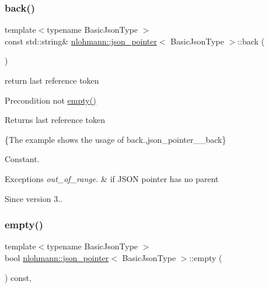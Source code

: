 \subsubsection{\texorpdfstring{back()}{back()}}
{\footnotesize\ttfamily template$<$typename Basic\+Json\+Type $>$ \\
const std\+::string\& \hyperlink{classnlohmann_1_1json__pointer}{nlohmann\+::json\+\_\+pointer}$<$ Basic\+Json\+Type $>$\+::back (\begin{DoxyParamCaption}{ }\end{DoxyParamCaption})\hspace{0.3cm}{\ttfamily [inline]}}



return last reference token 

\begin{DoxyPrecond}{Precondition}
not {\ttfamily \hyperlink{classnlohmann_1_1json__pointer_a649252bda4a2e75a0915b11a25d8bcc3}{empty()}} 
\end{DoxyPrecond}
\begin{DoxyReturn}{Returns}
last reference token
\end{DoxyReturn}
\{The example shows the usage of {\ttfamily back}.,json\+\_\+pointer\+\_\+\+\_\+back\}

Constant.


\begin{DoxyExceptions}{Exceptions}
{\em out\+\_\+of\+\_\+range.} & if J\+S\+ON pointer has no parent\\
\hline
\end{DoxyExceptions}
\begin{DoxySince}{Since}
version 3.. 
\end{DoxySince}
\mbox{\label{classnlohmann_1_1json__pointer_a649252bda4a2e75a0915b11a25d8bcc3}} 
\subsubsection{\texorpdfstring{empty()}{empty()}}
{\footnotesize\ttfamily template$<$typename Basic\+Json\+Type $>$ \\
bool \hyperlink{classnlohmann_1_1json__pointer}{nlohmann\+::json\+\_\+pointer}$<$ Basic\+Json\+Type $>$\+::empty (\begin{DoxyParamCaption}{ }\end{DoxyParamCaption}) const\hspace{0.3cm}{\ttfamily [inline]}, {\ttfamily [noexcept]}}



